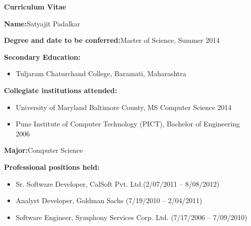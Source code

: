 \begin{titlepage}

\begin{center}
\vspace{0.1in}
\large{\bf Curriculum Vitae}
\bigskip \bigskip
\end{center}

\begin{flushleft}
	{\bf Name:}{\hspace{3mm}}Satyajit Padalkar\\
	\vspace{6pt}
	
	{\bf Degree and date to be conferred:}{\hspace{3mm}}Master of Science, Summer 2014 \\
	\vspace{6pt}
	
	{\bf Secondary Education:}
	\begin{itemize}
	\item{{\hspace{3mm}}Tuljaram Chaturchand College, Baramati, Maharashtra}\\
	\end{itemize}
	\vspace{6pt}
	
	{\bf Collegiate institutions attended:}
	\begin{itemize}
	\item{University of Maryland Baltimore County, MS Computer Science \hfill 2014}\\
	\item{Pune Institute of Computer Technology (PICT), Bachelor of Engineering \hfill 2006}\\
	\end{itemize}
	\vspace{6pt}
	
	{\bf Major:}{\hspace{3mm}}Computer Science\\
	\vspace{6pt}
	
	{\bf Professional positions held:}
	\begin{itemize}
	\item{Sr. Software Developer, CalSoft Pvt. Ltd.\hfill (2/07/2011 -- 8/08/2012)}\\
	\item{Analyst Developer, Goldman Sachs \hfill (7/19/2010 -- 2/04/2011)}\\
	\item{Software Engineer, Symphony Services Corp. Ltd. \hfill (7/17/2006 -- 7/09/2010)}\\
	\end{itemize}
\end{flushleft}
       
\end{titlepage}
\par\vfil


